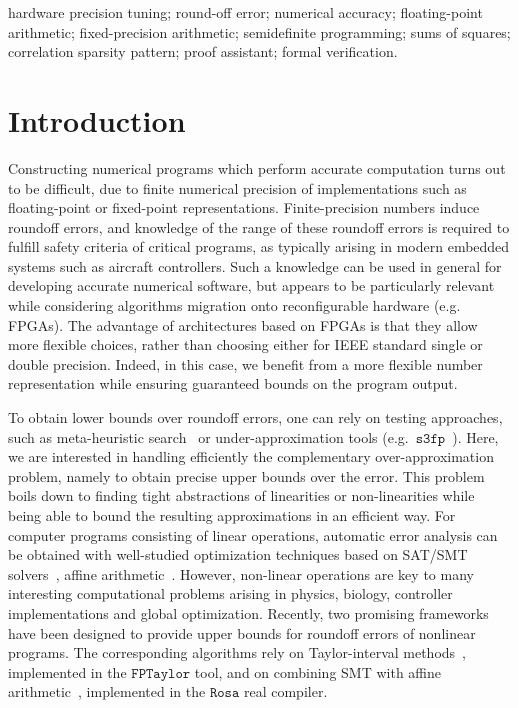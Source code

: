\documentclass[preprint,fleqn,nocopyrightspace]{sigplanconf}
\newcommand{\sthreefp}{\mathtt{s3fp}}
\newcommand{\rosa}{\mathtt{Rosa}}
\newcommand{\fptaylor}{\mathtt{FPTaylor}}
\theoremstyle{plain}
\begin{document}



\keywords
hardware precision tuning; round-off error; numerical accuracy; floating-point arithmetic; fixed-precision arithmetic; semidefinite programming; sums of squares; correlation sparsity pattern; proof assistant; formal verification.
\section{Introduction} %
\label{sec:intro}
%
Constructing numerical programs which perform accurate computation turns out to be difficult, due to finite numerical precision of implementations such as floating-point or fixed-point representations. Finite-precision numbers induce roundoff errors,  and knowledge of the range of these roundoff errors is required to fulfill safety criteria of critical programs, as typically arising in modern embedded systems such as aircraft controllers. Such a knowledge can be used in general for developing accurate numerical software, but appears to be particularly relevant while considering algorithms migration onto reconfigurable hardware (e.g. FPGAs). The advantage of architectures based on FPGAs is that they allow more flexible choices, rather than choosing either for IEEE standard single or double precision. Indeed, in this case, we benefit from a more flexible number representation while ensuring guaranteed bounds on the program output. 

To obtain lower bounds over roundoff errors, one can rely on testing approaches, such as meta-heuristic search~\cite{Borges12Test} or under-approximation tools (e.g.~$\sthreefp$~\cite{Chiang14s3fp}). Here, we are interested in handling efficiently the complementary over-approximation problem, namely to obtain precise upper bounds over the error. This problem boils down to finding tight abstractions of linearities or non-linearities while being able to bound the resulting approximations in an efficient way.  
%
For computer programs consisting of linear operations, automatic error analysis can be obtained with well-studied optimization techniques based on SAT/SMT solvers~\cite{hgbk2012fmcad}, affine arithmetic~\cite{fluctuat}. However, non-linear operations are key to many interesting computational problems arising in physics, biology, controller implementations and global optimization. 
Recently, two promising frameworks have been designed to provide upper bounds for roundoff errors of nonlinear programs. The corresponding algorithms rely on Taylor-interval methods~\cite{fptaylor15}, implemented in the $\fptaylor$ tool, and on combining SMT with affine arithmetic~\cite{Darulova14Popl}, implemented in the $\rosa$ real compiler.
\end{document}
